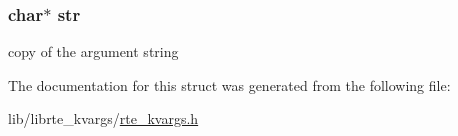 \subsubsection[{str}]{\setlength{\rightskip}{0pt plus 5cm}char$\ast$ str}\label{structrte__kvargs_ab50d783982593ef993ea0b68f7ad8b80}
copy of the argument string 

The documentation for this struct was generated from the following file\+:\begin{DoxyCompactItemize}
\item 
lib/librte\+\_\+kvargs/\hyperlink{rte__kvargs_8h}{rte\+\_\+kvargs.\+h}\end{DoxyCompactItemize}
